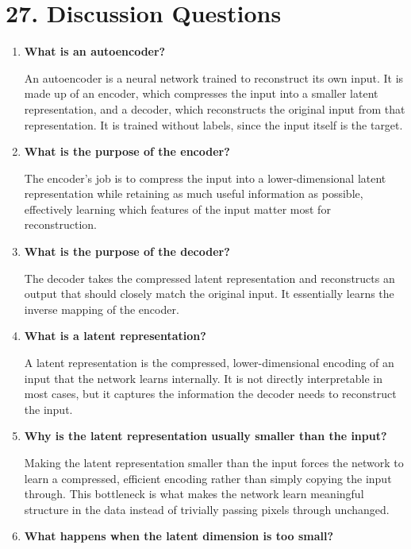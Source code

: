 \documentclass[10pt]{article}
\begin{document}
\section*{27. Discussion Questions}

\begin{enumerate}

\item \textbf{What is an autoencoder?}

An autoencoder is a neural network trained to reconstruct its own input. It is made up of an encoder, which compresses the input into a smaller latent representation, and a decoder, which reconstructs the original input from that representation. It is trained without labels, since the input itself is the target.

\item \textbf{What is the purpose of the encoder?}

The encoder's job is to compress the input into a lower-dimensional latent representation while retaining as much useful information as possible, effectively learning which features of the input matter most for reconstruction.

\item \textbf{What is the purpose of the decoder?}

The decoder takes the compressed latent representation and reconstructs an output that should closely match the original input. It essentially learns the inverse mapping of the encoder.

\item \textbf{What is a latent representation?}

A latent representation is the compressed, lower-dimensional encoding of an input that the network learns internally. It is not directly interpretable in most cases, but it captures the information the decoder needs to reconstruct the input.

\item \textbf{Why is the latent representation usually smaller than the input?}

Making the latent representation smaller than the input forces the network to learn a compressed, efficient encoding rather than simply copying the input through. This bottleneck is what makes the network learn meaningful structure in the data instead of trivially passing pixels through unchanged.

\item \textbf{What happens when the latent dimension is too small?}


\end{enumerate}
\end{document}
